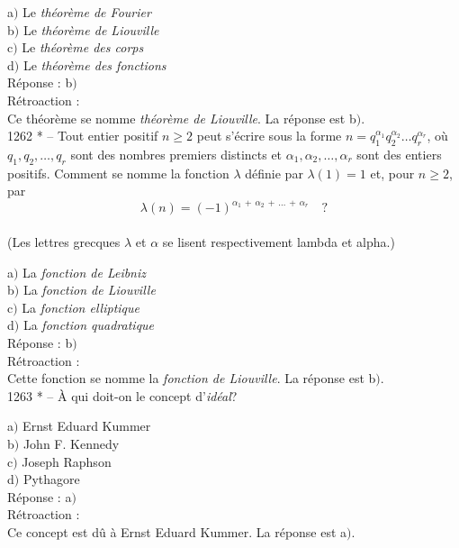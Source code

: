 ﻿\documentclass[letterpaper, 12pt]{article}
\begin{document}
a$)$ Le {\sl th\'eor\`eme de Fourier} \\
b$)$ Le {\sl th\'eor\`eme de Liouville} \\
c$)$ Le {\sl th\'eor\`eme des corps} \\
d$)$ Le {\sl th\'eor\`eme des fonctions}\\

R\'eponse : b$)$\\

R\'etroaction : \\
Ce th\'eor\`eme se nomme {\sl th\'eor\`eme de Liouville}.
La r\'eponse est b$)$.\\

1262 * -- Tout entier positif $n\ge2$ peut s'\'ecrire sous la forme
$n=q_1^{\alpha_1}q_2^{\alpha_2}\ldots q_r^{\alpha_r}$, o\`u
$q_1,q_2,\ldots,q_r$ sont des nombres premiers distincts et
$\alpha_1,\alpha_2,\ldots,\alpha_r$ sont des entiers positifs.
Comment se nomme la fonction $\lambda$ d\'efinie par $\lambda(1)=1$
et, pour $n\ge2$, par
$$\lambda(n)=(-1)^{\alpha_1\,+\,\alpha_2\,+\,\ldots\,+\,\alpha_r}\quad?$$\\
(Les lettres grecques $\lambda$ et $\alpha$ se lisent respectivement
lambda et alpha.)

a$)$ La {\sl fonction de Leibniz} \\
b$)$ La {\sl fonction de Liouville} \\
c$)$ La {\sl fonction elliptique} \\
d$)$ La {\sl fonction quadratique}\\

R\'eponse : b$)$\\

R\'etroaction : \\
Cette fonction se nomme la {\sl fonction de Liouville}.
La r\'eponse est b$)$.\\

1263 * -- \`A qui doit-on le concept d'{\sl id\'eal}?

a$)$ Ernst Eduard Kummer \\
b$)$ John F. Kennedy \\
c$)$ Joseph Raphson \\
d$)$ Pythagore\\

R\'eponse : a$)$\\

R\'etroaction : \\
Ce concept est d\^u \`a Ernst Eduard Kummer.
La r\'eponse est a$)$.\\
\end{document}
